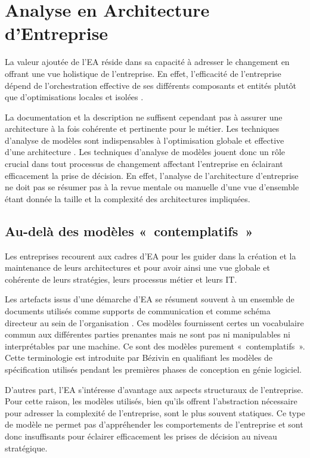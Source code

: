 \section{Analyse en Architecture d'Entreprise}

La valeur ajoutée de l'EA réside dans sa capacité à adresser le changement en offrant une vue holistique de l'entreprise. En effet, l'efficacité de l'entreprise  dépend de l'orchestration effective de ses différents composants et entités plutôt que d'optimisations locales et isolées \cite{nadler1992organizational}. 

La documentation et la description ne suffisent cependant pas à assurer une architecture à la fois cohérente et pertinente pour le métier. Les techniques d'analyse de modèles sont indispensables à l'optimisation globale et effective d'une architecture \cite{lankhorst2013enterprise}. Les techniques d'analyse de modèles jouent donc un rôle crucial dans tout processus de changement affectant l'entreprise en éclairant efficacement la prise de décision. En effet, l'analyse de l'architecture d'entreprise ne doit pas se résumer pas à la revue mentale ou manuelle d'une vue d'ensemble étant donnée la taille et la complexité des architectures impliquées.

	\subsection{Au-delà des modèles «~contemplatifs~»}

Les entreprises recourent aux cadres d'EA pour les guider dans la création et la maintenance de leurs architectures et pour avoir ainsi une vue globale et cohérente de leurs stratégies, leurs processus métier et leurs IT.

Les artefacts issus d'une démarche d'EA se résument souvent à un ensemble de documents utilisés comme supports de communication et comme schéma directeur au sein de l'organisation \cite{kulkarni_modelling_2013} \cite{clark_towards_2014}. Ces modèles fournissent certes un vocabulaire commun aux différentes parties prenantes mais ne sont pas ni manipulables ni interprétables par une machine. Ce sont des modèles purement «~contemplatifs~». Cette terminologie est introduite par Bézivin en qualifiant les modèles de spécification utilisés pendant les premières phases de conception en génie logiciel. 

D'autres part, l'EA s'intéresse d'avantage aux aspects structuraux de l'entreprise. Pour cette raison, les modèles utilisés, bien qu'ils offrent l'abstraction nécessaire pour adresser la complexité de l'entreprise, sont le plus souvent statiques. Ce type de modèle ne permet pas d'appréhender les comportements de l'entreprise et sont donc insuffisants pour éclairer efficacement les prises de décision au niveau stratégique.

